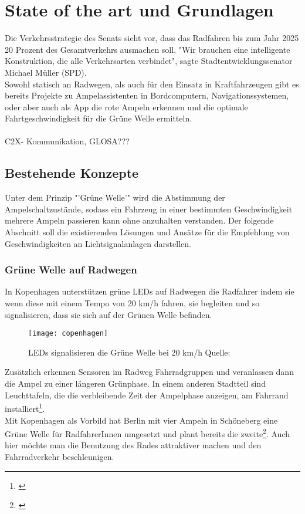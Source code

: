 \chapter{State of the art und Grundlagen}
Die Verkehrsstrategie des Senats sieht vor, dass das Radfahren bis zum Jahr 2025 20 Prozent des Gesamtverkehrs ausmachen soll. \cite{Mopo}
"Wir brauchen eine intelligente Konstruktion, die alle Verkehrsarten verbindet", sagte Stadtentwicklungssenator Michael Müller (SPD).\\
Sowohl statisch an Radwegen, als auch für den Einsatz in Kraftfahrzeugen gibt es bereits Projekte zu Ampelassistenten in Bordcomputern, Navigationssystemen, oder aber auch als App die rote Ampeln erkennen und die optimale Fahrtgeschwindigkeit für die Grüne Welle ermitteln.\\\\
\gls{C2X}- Kommunikation, GLOSA???\\
\section{Bestehende Konzepte}
Unter dem Prinzip "'Grüne Welle'" wird die Abstimmung der Ampelschaltzustände, sodass ein Fahrzeug in einer bestimmten Geschwindigkeit mehrere Ampeln passieren kann ohne anzuhalten verstanden. Der folgende Abschnitt soll die existierenden Lösungen und Ansätze für die Empfehlung von Geschwindigkeiten an Lichtsignalanlagen darstellen.
\subsection{Grüne Welle auf Radwegen}
In Kopenhagen unterstützen grüne \gls{LED}s auf Radwegen die Radfahrer indem sie wenn diese mit einem Tempo von 20 km/h fahren, sie begleiten und so signalisieren, dass sie sich auf der Grünen Welle befinden. 
\begin{figure}[H]  
    \centering  
    \texttt{[image: copenhagen]}
    \label{fig:copenhagen}
    \caption[Grüne Welle durch \gls{LED}s]{\gls{LED}s signalisieren die Grüne Welle bei 20 km/h  Quelle: \cite{NYT}}
\end{figure}
Zusätzlich erkennen Sensoren im Radweg Fahrradgruppen und veranlassen dann die Ampel zu einer längeren Grünphase. In einem anderen Stadtteil sind Leuchttafeln, die die verbleibende Zeit der Ampelphase anzeigen, am Fahrrand installiert\footnote{\cite{KopIng}}.\\
Mit Kopenhagen als Vorbild hat Berlin mit vier Ampeln in Schöneberg eine Grüne Welle für RadfahrerInnen umgesetzt und plant bereits die zweite\footnote{\cite{BZ}}. Auch hier möchte man die Benutzung des Rades attraktiver machen und den Fahrradverkehr beschleunigen.
